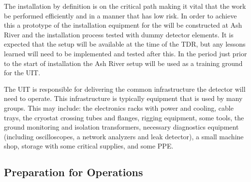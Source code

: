 The installation by definition is on the critical path making it vital
that the work be performed efficiently and in a manner that has low
risk. In order to achieve this a prototype of the installation
equipment for the   will be constructed at Ash
River and the installation process tested with dummy detector
elements. It is expected that the setup will be available at the time
of the TDR, but any lessons learned will need to be implemented and
tested after this. In the period just prior to the start of
installation the Ash River setup will be used as a training ground for
the UIT.

The UIT is responsible for delivering the common infrastructure
the detector will need to operate. This infrastructure is typically
equipment that is used by many groups. This may include: the
electronics racks with power and cooling, cable trays, the cryostat
crossing tubes and flanges, rigging equipment, some tools, the ground
monitoring and isolation transformers, necessary diagnostics equipment
(including oscilloscopes, a network analyzers and leak detector), a
small machine shop, storage with some critical supplies, and some PPE.




\subsection{Preparation for Operations}

